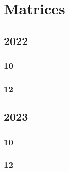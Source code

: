 \documentclass[11pt]{book}
\begin{document}
\chapter{Matrices}
\section{2022}
\subsection{10}

\subsection{12}

\section{2023}
\subsection{10}

\subsection{12}

%


% 
\backmatter
\appendix
\iffalse
\chapter{Conic Lines}
\section{Pair of Straight Lines}
%

\section{Intersection of Conics}

\section{ Chords of a Conic}

\section{ Tangent and Normal}

\fi
%

%
%
%
\latexprintindex
\end{document}
